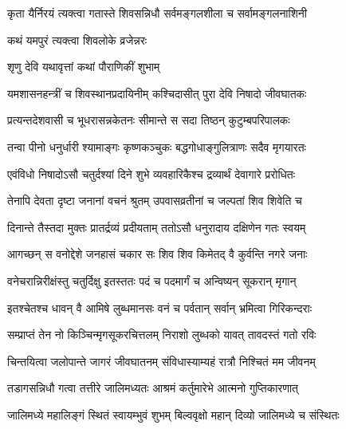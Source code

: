 \twolineshloka
{कृता यैर्निरयं त्यक्त्वा गतास्ते शिवसन्निधौ}
{सर्वमङ्गलशीला च सर्वामङ्गलनाशिनी}%



\onelineshloka
{कथं यमपुरं त्यक्त्वा शिवलोके व्रजेन्नरः}%



\onelineshloka
{शृणु देवि यथावृत्तां कथां पौराणिकीं शुभाम्}%

\twolineshloka
{यमशासनहन्त्रीं च शिवस्थानप्रदायिनीम्}
{कश्चिदासीत् पुरा देवि निषादो जीवघातकः\footnotemark{}}%

\twolineshloka
{प्रत्यन्तदेशवासी च भूधरासन्नकेतनः}
{सीमान्ते स सदा तिष्ठन् कुटुम्बपरिपालकः}%

\twolineshloka
{तन्वा पीनो धनुर्धारी श्यामाङ्गः कृष्णकञ्चुकः}
{बद्धगोधाङ्गुलित्राणः सदैव मृगयारतः}%

\twolineshloka
{एवंविधो निषादोऽसौ चतुर्दश्यां दिने शुभे}
{व्यवहारिकैश्च द्रव्यार्थं देवागारे प्ररोधितः}%

\twolineshloka
{तेनापि देवता दृष्टा जनानां वचनं श्रुतम्}
{उपवासव्रतीनां च जल्पतां शिव शिवेति च}%

\twolineshloka
{दिनान्ते तैस्तदा मुक्तः प्रातर्द्रव्यं प्रदीयताम्}
{ततोऽसौ धनुरादाय दक्षिणेन गतः स्वयम्}%

\twolineshloka
{आगच्छन् स वनोद्देशे जनहासं चकार सः}
{शिव शिव किमेतद् वै कुर्वन्ति नगरे जनाः}%

\twolineshloka
{वनेचरान्निरीक्षंस्तु चतुर्दिक्षु इतस्ततः}
{पदं च पदमार्गं च अन्विष्यन् सूकरान् मृगान्}%

\twolineshloka
{इतश्चेतश्च धावन् वै आमिषे लुब्धमानसः}
{वनं च पर्वतान् सर्वान् भ्रमित्वा गिरिकन्दराः}%

\twolineshloka
{सम्प्राप्तं तेन नो किञ्चिन्मृगसूकरचित्तलम्\footnotemark{}}
{निराशो लुब्धको यावत् तावदस्तं गतो रविः}%

\twolineshloka
{चिन्तयित्वा जलोपान्ते जागरं\footnotemark{} जीवघातनम्}
{संविधास्याम्यहं रात्रौ निश्चितं मम जीवनम्}%

\twolineshloka
{तडागसन्निधौ गत्वा तत्तीरे जालिमध्यतः}
{आश्रमं कर्तुमारेभे आत्मनो गुप्तिकारणात्}%

\twolineshloka
{जालिमध्ये महालिङ्गं स्थितं स्वायम्भुवं शुभम्}
{बिल्ववृक्षो महान् दिव्यो जालिमध्ये च संस्थितः}%

